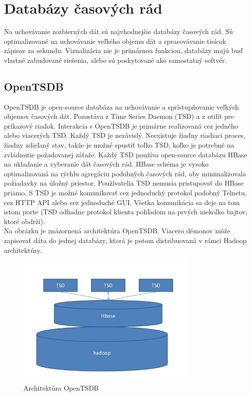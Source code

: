 \documentclass[12pt,twoside,color,cover,table]{fithesis3}
\begin{document}
\section{Databázy časových rád}
Na uchovávanie zozbierných dát sú najvhodnejšie databázy časových rád. Sú optimalizované na uchovávanie veľkého objemu dát a spracovávanie tisícok zápisov za sekundu. Vizualizácia nie je primárnou funkciou,
databázy majú buď vlastné zabudované riešenia, alebo sú poskytované ako samostatný softvér.

\subsection{OpenTSDB}
OpenTSDB je open-source databáza na uchovávanie a sprístupňovanie veľkých objemov časových dát. Pozostáva z Time Series Daemon (TSD) a z utilít pre príkazový riadok. Interakcia s OpenTSDB je primárne realizovaná cez jedného alebo viacerých TSD. Každý TSD je nezávislý.
Neexistuje žiadny riadiaci proces, žiadny zdieľaný stav, takže je možné spustiť toľko TSD, koľko je potrebné na zvládnutie požadovanej záťaže. Každý TSD používa open-source databázu HBase
na ukladanie a vyberanie dát časových rád. HBase schéma je vysoko optimalizovaná na rýchlu agregáciu podobných časových rád, aby minimalizovala požiadavky na úložný priestor. 
Používatelia TSD nemusia pristupovať do HBase priamo. S TSD je možné komunikovať cez jednoduchý protokol podobný Telnetu, cez HTTP API alebo cez jednoduché GUI. Všetka komunikácia
sa deje na tom istom porte (TSD odhadne protokol klienta pohľadom na prvých niekoľko bajtov, ktoré obdrží).%
\\Na obrázku je znázornená architektúra OpenTSDB. Viacero démonov môže zapisovať dáta do jednej databázy, ktorá je potom distribuovaná v rámci Hadoop architektúry.
\begin{figure}[h]
\begin{center}
       \includegraphics[width=0.8\textwidth]{images/opentsdb-arch.jpg}
       \caption{Architektúra OpenTSDB}%
\end{center}
\end{figure}
\end{document}
